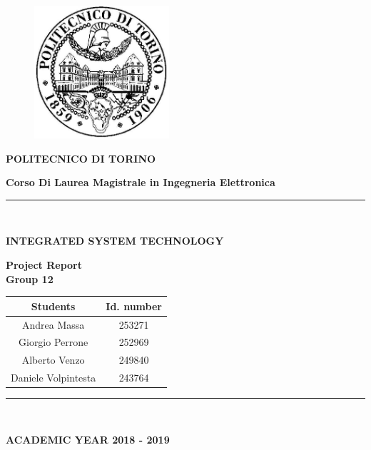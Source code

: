 \begin{titlepage}
	
	\begin{figure}[h]
		\centering
		\includegraphics[width = 5cm]{logopoli}
		\label{logo_polito}
	\end{figure}
	
	\begin{center}
		\textbf{{\LARGE POLITECNICO DI TORINO}}
	\end{center}
	
	\begin{center}
		\textbf{{\large Corso Di Laurea Magistrale in Ingegneria Elettronica}}
	\end{center}
	
	\begin{center}
		\rule{1\textwidth}{0.4pt}\\
	\end{center}
	
	\vspace{0 mm}
	
	\begin{center}
		\textbf{INTEGRATED SYSTEM TECHNOLOGY}
	\end{center}
	
	\vspace{5 mm}
	
	\begin{center}
		\textbf{\LARGE Project Report\\ Group 12} 
	\end{center}
	
	\vspace{20 mm}
	
	\begin{Large}
		\begin{center}
			\begin{tabular}{c c}
				\hline
				Students & Id. number \\ \hline
				Andrea Massa & 253271 \\ 
				Giorgio Perrone & 252969 \\ 
				Alberto Venzo & 249840 \\
				Daniele Volpintesta & 243764 \\ 
				\hline
			\end{tabular}
		\end{center}
	\end{Large}
	
	\vspace{40 mm}
	
	\begin{center}
		\rule{1\textwidth}{0.4pt}\\
	\end{center}
	
	\begin{center}
		\textbf{ACADEMIC YEAR 2018 - 2019}
	\end{center}
	
\end{titlepage}